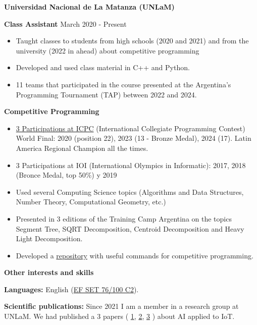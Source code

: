 \documentclass[11pt]{article}
\begin{document}
\vspace{24pt}

\textbf{Universidad Nacional de La Matanza (UNLaM)}

\textbf{Class Assistant} \hfill March 2020 - Present
\begin{itemize}[noitemsep, topsep=0pt, partopsep=0pt, parsep=0pt]
    \item Taught classes to students from high schools (2020 and 2021) and from the university (2022 in ahead) about competitive programming
    \item Developed and used class material in C++ and Python.
    \item 11 teams that participated in the course presented at the Argentina's Programming Tournament (TAP) between 2022 and 2024.
\end{itemize}

\vspace{24pt}

\textbf{Competitive Programming} 
\begin{itemize}[noitemsep, topsep=0pt, partopsep=0pt, parsep=0pt]
   \item \href{https://icpc.global/ICPCID/DV1XEVUDPG8J}{3 Participations at ICPC} (International Collegiate Programming Contest) World Final: 2020 (position 22), 2023 (13 - Bronze Medal), 2024 (17). Latin America Regional Champion all the times.
   \item 3 Participations at IOI (International Olympics in Informatic): 2017, 2018 (Bronce Medal, top 50\%) y 2019
    \item Used several Computing Science topics (Algorithms and Data Structures, Number Theory, Computational Geometry, etc.)
    \item Presented in 3 editions of the Training Camp Argentina on the topics Segment Tree, SQRT Decomposition, Centroid Decomposition and Heavy Light Decomposition.
    \item Developed a \href{https://github.com/LautaroLasorsa/competitive-programming-suite}{repository} with useful commands for competitive programming.
   
\end{itemize}

\begin{center}
    \textbf{Other interests and skills}
\end{center}

\textbf{Languages:} English (\href{https://cert.efset.org/Pymcaz}{EF SET 76/100 C2}).

\textbf{Scientific publications:} Since 2021 I am a member in a research group at UNLaM. We had published a 3 papers (
\href{https://github.com/LautaroLasorsa/CONAIISI-2023}{1}, \href{https://github.com/LautaroLasorsa/CONAIISI-2024}{2},
\href{https://github.com/carlucho1/CONAIISI-2024-2}{3}
) about AI applied to IoT. 
 


\end{document}
